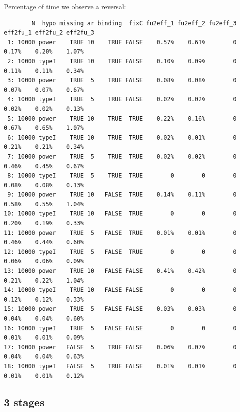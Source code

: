 \documentclass[12pt]{article}
\begin{document}
Percentage of time we observe a reversal:
\begin{verbatim}
        N  hypo missing ar binding  fixC fu2eff_1 fu2eff_2 fu2eff_3 eff2fu_1 eff2fu_2 eff2fu_3
 1: 10000 power    TRUE 10    TRUE FALSE    0.57%    0.61%        0    0.17%    0.20%    1.07%
 2: 10000 typeI    TRUE 10    TRUE FALSE    0.10%    0.09%        0    0.11%    0.11%    0.34%
 3: 10000 power    TRUE  5    TRUE FALSE    0.08%    0.08%        0    0.07%    0.07%    0.67%
 4: 10000 typeI    TRUE  5    TRUE FALSE    0.02%    0.02%        0    0.02%    0.02%    0.13%
 5: 10000 power    TRUE 10    TRUE  TRUE    0.22%    0.16%        0    0.67%    0.65%    1.07%
 6: 10000 typeI    TRUE 10    TRUE  TRUE    0.02%    0.01%        0    0.21%    0.21%    0.34%
 7: 10000 power    TRUE  5    TRUE  TRUE    0.02%    0.02%        0    0.46%    0.45%    0.67%
 8: 10000 typeI    TRUE  5    TRUE  TRUE        0        0        0    0.08%    0.08%    0.13%
 9: 10000 power    TRUE 10   FALSE  TRUE    0.14%    0.11%        0    0.58%    0.55%    1.04%
10: 10000 typeI    TRUE 10   FALSE  TRUE        0        0        0    0.20%    0.19%    0.33%
11: 10000 power    TRUE  5   FALSE  TRUE    0.01%    0.01%        0    0.46%    0.44%    0.60%
12: 10000 typeI    TRUE  5   FALSE  TRUE        0        0        0    0.06%    0.06%    0.09%
13: 10000 power    TRUE 10   FALSE FALSE    0.41%    0.42%        0    0.21%    0.22%    1.04%
14: 10000 typeI    TRUE 10   FALSE FALSE        0        0        0    0.12%    0.12%    0.33%
15: 10000 power    TRUE  5   FALSE FALSE    0.03%    0.03%        0    0.04%    0.04%    0.60%
16: 10000 typeI    TRUE  5   FALSE FALSE        0        0        0    0.01%    0.01%    0.09%
17: 10000 power   FALSE  5    TRUE FALSE    0.06%    0.07%        0    0.04%    0.04%    0.63%
18: 10000 typeI   FALSE  5    TRUE FALSE    0.01%    0.01%        0    0.01%    0.01%    0.12%
\end{verbatim}

\clearpage

\subsection{3 stages}
\label{sec:org755f5ec}
\end{document}
